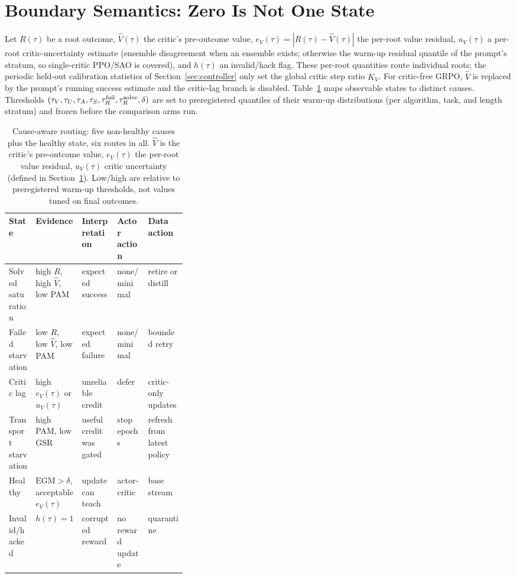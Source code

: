 \documentclass{article}
\newcommand{\egm}{\mathrm{EGM}}
\begin{document}
\section{Boundary Semantics: Zero Is Not One State}
\label{sec:semantics}

Let $R(\tau)$ be a root outcome, $\hat V(\tau)$ the critic's pre-outcome value,
$e_V(\tau)=|R(\tau)-\hat V(\tau)|$ the per-root value residual,
$u_V(\tau)$ a per-root critic-uncertainty estimate (ensemble disagreement when
an ensemble exists; otherwise the warm-up residual quantile of the prompt's
stratum, so single-critic PPO/SAO is covered), and $h(\tau)$ an invalid/hack
flag.  These per-root quantities route individual roots; the periodic
held-out calibration statistics of Section~\ref{sec:controller} only set the
global critic step ratio $K_V$.  For critic-free GRPO, $\hat V$ is replaced by
the prompt's running success estimate and the critic-lag branch is disabled.  Table~\ref{tab:states} maps observable states to distinct
causes.  Thresholds $(\tau_V,\tau_U,\tau_A,\tau_S,\tau_R^{\rm fail},\tau_R^{\rm solve},\delta)$
are set to preregistered quantiles of their warm-up distributions (per
algorithm, task, and length stratum) and frozen before the comparison arms run.

\begin{table}[t]
\centering
\caption{Cause-aware routing: five non-healthy causes plus the healthy
state, six routes in all.  $\hat V$ is the critic's pre-outcome value, $e_V(\tau)$
the per-root value residual, $u_V(\tau)$ critic uncertainty (defined in
Section~\ref{sec:semantics}).  Low/high are relative to preregistered
warm-up thresholds, not values tuned on final outcomes.}
\label{tab:states}
\scriptsize
\setlength{\tabcolsep}{2pt}
\begin{tabularx}{\linewidth}{@{}>{\raggedright\arraybackslash}p{0.15\linewidth}>{\raggedright\arraybackslash}p{0.2\linewidth}XXX@{}}
\toprule
State & Evidence & Interpretation & Actor action & Data action \\
\midrule
Solved saturation & high $R$, high $\hat V$, low PAM & expected success & none/minimal & retire or distill \\
Failed starvation & low $R$, low $\hat V$, low PAM & expected failure & none/minimal & bounded retry \\
Critic lag & high $e_V(\tau)$ or $u_V(\tau)$ & unreliable credit & defer & critic-only updates \\
Transport starvation & high PAM, low GSR & useful credit was gated & stop epochs & refresh from latest policy \\
Healthy & $\egm>\delta$, acceptable $e_V(\tau)$ & update can teach & actor-critic & base stream \\
Invalid/hacked & $h(\tau)=1$ & corrupted reward & no reward update & quarantine \\
\bottomrule
\end{tabularx}
\end{table}
\end{document}
